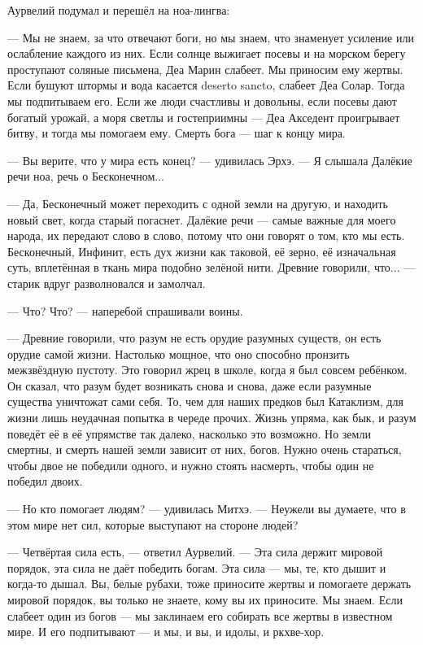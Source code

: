 Аурвелий подумал и перешёл на ноа-лингва:

--- Мы не знаем, за что отвечают боги, но мы знаем, что знаменует усиление или ослабление каждого из них.
Если солнце выжигает посевы и на морском берегу проступают соляные письмена, Деа Марин слабеет.
Мы приносим ему жертвы.
Если бушуют штормы и вода касается deserto sancto\FM, слабеет Деа Солар.
Тогда мы подпитываем его.
Если же люди счастливы и довольны, если посевы дают богатый урожай, а моря светлы и гостеприимны --- Деа Акседент проигрывает битву, и тогда мы помогаем ему.
Смерть бога --- шаг к концу мира.

--- Вы верите, что у мира есть конец? --- удивилась Эрхэ.
--- Я слышала Далёкие речи ноа, речь о Бесконечном...

--- Да, Бесконечный может переходить с одной земли на другую, и находить новый свет, когда старый погаснет.
Далёкие речи --- самые важные для моего народа, их передают слово в слово, потому что они говорят о том, кто мы есть.
Бесконечный, Инфинит, есть дух жизни как таковой, её зерно, её изначальная суть, вплетённая в ткань мира подобно зелёной нити.
Древние говорили, что... --- старик вдруг разволновался и замолчал.

--- Что? Что? --- наперебой спрашивали воины.

--- Древние говорили, что разум не есть орудие разумных существ, он есть орудие самой жизни.
Настолько мощное, что оно способно пронзить межзвёздную пустоту.
Это говорил жрец в школе, когда я был совсем ребёнком.
Он сказал, что разум будет возникать снова и снова, даже если разумные существа уничтожат сами себя.
То, чем для наших предков был Катаклизм, для жизни лишь неудачная попытка в череде прочих.
Жизнь упряма, как бык, и разум поведёт её в её упрямстве так далеко, насколько это возможно.
Но земли смертны, и смерть нашей земли зависит от них, богов.
Нужно очень стараться, чтобы двое не победили одного, и нужно стоять насмерть, чтобы один не победил двоих.

--- Но кто помогает людям? --- удивилась Митхэ.
--- Неужели вы думаете, что в этом мире нет сил, которые выступают на стороне людей?

--- Четвёртая сила есть, --- ответил Аурвелий.
--- Эта сила держит мировой порядок, эта сила не даёт победить богам.
Эта сила --- мы, те, кто дышит и когда-то дышал.
Вы, белые рубахи, тоже приносите жертвы и помогаете держать мировой порядок, вы только не знаете, кому вы их приносите.
Мы знаем.
Если слабеет один из богов --- мы заклинаем его собирать все жертвы в известном мире.
И его подпитывают --- и мы, и вы, и идолы, и ркхве-хор.

